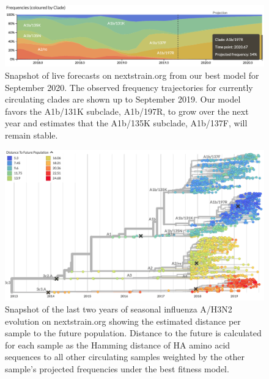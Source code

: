 \begin{figure}[ht]
  \begin{center}
  \includegraphics[width=\textwidth]{figures/nextstrain-forecasts-for-september-2020.png}
  \caption{
    Snapshot of live forecasts on nextstrain.org from our best model for September 2020.
    The observed frequency trajectories for currently circulating clades are shown up to September 2019.
    Our model favors the A1b/131K subclade, A1b/197R, to grow over the next year and estimates that the A1b/135K subclade, A1b/137F, will remain stable.
  }
  \label{fig:nextstrain_forecasts}
  \end{center}
\end{figure}

\begin{figure}[ht]
  \begin{center}
  \includegraphics[width=\textwidth]{figures/nextstrain-weighted-distance-to-future-per-strain.png}
  \caption{
    Snapshot of the last two years of seasonal influenza A/H3N2 evolution on nextstrain.org showing the estimated distance per sample to the future population.
    Distance to the future is calculated for each sample as the Hamming distance of HA amino acid sequences to all other circulating samples weighted by the other sample's projected frequencies under the best fitness model.
  }
  \label{fig:nextstrain_distance_to_future}
  \end{center}
\end{figure}

